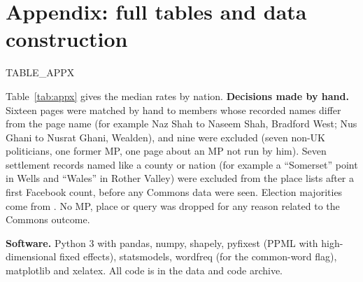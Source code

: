 \documentclass[11pt,a4paper]{article}
\begin{document}
\appendix
\section{Appendix: full tables and data construction}
{{TABLE_APPX}}

Table~\ref{tab:appx} gives the median rates by nation. \textbf{Decisions made by hand.} Sixteen pages were matched by hand to members whose recorded names differ from the page name (for example Naz Shah to Naseem Shah, Bradford West; Nus Ghani to Nusrat Ghani, Wealden), and nine were excluded (seven non-UK politicians, one former MP, one page about an MP not run by him). Seven settlement records named like a county or nation (for example a ``Somerset'' point in Wells and ``Wales'' in Rother Valley) were excluded from the place lists after a first Facebook count, before any Commons data were seen. Election majorities come from \citet{hotham2026b}. No MP, place or query was dropped for any reason related to the Commons outcome.

\textbf{Software.} Python 3 with pandas, numpy, shapely, pyfixest (PPML with high-dimensional fixed effects), statsmodels, wordfreq (for the common-word flag), matplotlib and xelatex. All code is in the data and code archive.
\end{document}
